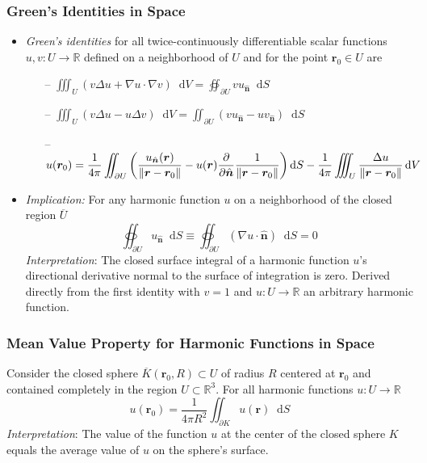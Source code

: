 \documentclass[11pt, a4paper]{article}
\newcommand{\diff}{\mathop{}\!\mathrm{d}} %
\renewcommand{\vec}[1]{\bm{#1}}
\newcommand{\uvec}[1]{\hat{\vec{#1}}}
\renewcommand{\grad}{\nabla}
\newcommand{\R}{\mathbb{R}} %
\begin{document}
\subsubsection{Green's Identities in Space}
\begin{itemize}
	\item \textit{Green's identities} for all twice-continuously differentiable scalar functions $ u, v: U \to \R $ defined on a neighborhood of $ U $ and for the point $ \bm{r}_0 \in U $  are
	\begin{itemize}
		\item[--] $ \displaystyle{\iiint_{U} \left(v \Delta u +  \grad{u} \cdot \grad{v}\right) \diff V = \oiint_{\partial U} v u_{\uvec{n}}\diff S } $\\
		
		\item[--] $ \displaystyle{ \iiint_U \left(v \Delta u - u \Delta v  \right) \diff V = \iint_{\partial U} \left(v u_{\uvec{n}} - u v_{\uvec{n}}  \right)\diff S  } $
		
		\item[--] $ \displaystyle{u(\bm{r}_0) = \frac{1}{4\pi} \iint_{\partial U}\left(\frac{u_{\uvec{n}}(\bm{r})}{\norm{\bm{r} - \bm{r}_0}} - u(\bm{r}) \pdv{}{\uvec{n}}\frac{1}{\norm{\bm{r} - \bm{r}_0}}  \right) \diff S - \frac{1}{4\pi} \iiint_U \frac{\Delta u}{\norm{\bm{r} - \bm{r}_0}} \diff V } $
	\end{itemize}
	
	\item \textit{Implication:} For any harmonic function $ u $ on a neighborhood of the closed region $ \overline{U} $
	\begin{equation*}
		\oiint_{\partial U} u_{\uvec{n}} \diff S \equiv \oiint_{\partial U} (\grad{u} \cdot \uvec{n} )\diff S  = 0
	\end{equation*}
	\textit{Interpretation}: The closed surface integral of a harmonic function $ u $'s directional derivative normal to the surface of integration is zero. Derived directly from the first identity with $ v = 1 $ and $ u : U \to \R $ an arbitrary harmonic function.
\end{itemize}

\subsubsection{Mean Value Property for Harmonic Functions in Space}
Consider the closed sphere $ \overline{K}(\bm{r}_0, R) \subset U $ of radius $ R $ centered at $ \bm{r}_{0} $ and contained completely in the region $ U \subset \R^{3} $. For all harmonic functions $ u: U \to \R $
\begin{equation*}
	u(\bm{r}_0) = \frac{1}{4\pi R^2} \iint_{\partial K} u(\bm{r}) \diff S
\end{equation*}
\textit{Interpretation}: The value of the function $ u $ at the center of the closed sphere $ K $ equals the average value of $ u $ on the sphere's surface.
\end{document}
